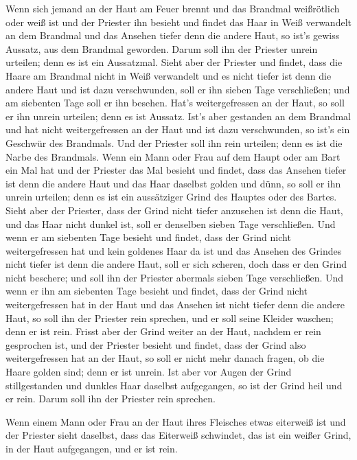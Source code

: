  Wenn sich jemand an der Haut am Feuer brennt und das
Brandmal weißrötlich oder weiß ist  und der Priester ihn
besieht und findet das Haar in Weiß verwandelt an dem Brandmal und das
Ansehen tiefer denn die andere Haut, so ist's gewiss Aussatz, aus dem
Brandmal geworden. Darum soll ihn der Priester unrein urteilen; denn es
ist ein Aussatzmal.  Sieht aber der Priester und findet,
dass die Haare am Brandmal nicht in Weiß verwandelt und es nicht tiefer
ist denn die andere Haut und ist dazu verschwunden, soll er ihn sieben
Tage verschließen;  und am siebenten Tage soll er ihn
besehen. Hat's weitergefressen an der Haut, so soll er ihn unrein
urteilen; denn es ist Aussatz.  Ist's aber gestanden an
dem Brandmal und hat nicht weitergefressen an der Haut und ist dazu
verschwunden, so ist's ein Geschwür des Brandmals. Und der Priester soll
ihn rein urteilen; denn es ist die Narbe des Brandmals. 
Wenn ein Mann oder Frau auf dem Haupt oder am Bart ein Mal hat
 und der Priester das Mal besieht und findet, dass das
Ansehen tiefer ist denn die andere Haut und das Haar daselbst golden und
dünn, so soll er ihn unrein urteilen; denn es ist ein aussätziger Grind
des Hauptes oder des Bartes.  Sieht aber der Priester,
dass der Grind nicht tiefer anzusehen ist denn die Haut, und das Haar
nicht dunkel ist, soll er denselben sieben Tage verschließen.
 Und wenn er am siebenten Tage besieht und findet, dass
der Grind nicht weitergefressen hat und kein goldenes Haar da ist und
das Ansehen des Grindes nicht tiefer ist denn die andere Haut,
 soll er sich scheren, doch dass er den Grind nicht
beschere; und soll ihn der Priester abermals sieben Tage verschließen.
 Und wenn er ihn am siebenten Tage besieht und findet,
dass der Grind nicht weitergefressen hat in der Haut und das Ansehen ist
nicht tiefer denn die andere Haut, so soll ihn der Priester rein
sprechen, und er soll seine Kleider waschen; denn er ist rein.
 Frisst aber der Grind weiter an der Haut, nachdem er
rein gesprochen ist,  und der Priester besieht und
findet, dass der Grind also weitergefressen hat an der Haut, so soll er
nicht mehr danach fragen, ob die Haare golden sind; denn er ist unrein.
 Ist aber vor Augen der Grind stillgestanden und dunkles
Haar daselbst aufgegangen, so ist der Grind heil und er rein. Darum soll
ihn der Priester rein sprechen.

 Wenn einem Mann oder Frau an der Haut ihres Fleisches
etwas eiterweiß ist  und der Priester sieht daselbst,
dass das Eiterweiß schwindet, das ist ein weißer Grind, in der Haut
aufgegangen, und er ist rein.

